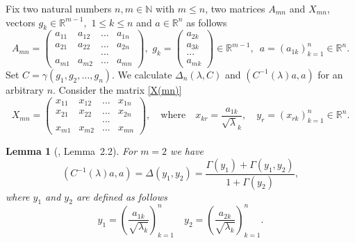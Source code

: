 \documentclass[preprint,12pt]{elsarticle}
\newcommand{\commA}[1]{\marginpar{%
\begin{color}{red}
\vskip-\baselineskip %
\raggedright\footnotesize
\itshape\hrule \smallskip A: #1\par\smallskip\hrule\end{color}}}
\newtheorem{lem}[thm]{Lemma}
\numberwithin{equation}{section}
\begin{document}
%
Fix two natural numbers $n,m\in \mathbb N$ with $m\leq n$, two matrices $A_{mn}$ and $X_{mn}$, vectors $g_k\in\mathbb R^{m-1},\,\,1\leq k\leq n$
and $a\in \mathbb R^n$ as follows
\begin{equation} 
\label{A(mn)}
A_{mn}\!=\!\left(
	\begin{array}{cccc}
	a_{11}&a_{12}          &...&a_{1n}\\
	a_{21}&a_{22}          &...&a_{2n}\\
	&&...&\\
	a_{m1}&a_{m2}          &...&a_{mn}
	\end{array}
	\right),\,\, 
g_k=\left(
	\begin{array}{c}
	a_{2k}\\
	a_{3k}\\
	... \\
	a_{mk}
	\end{array}
	\right)\in \mathbb R^{m-1},\,\,\, a=(a_{1k})_{k=1}^n\in \mathbb R^n.	
\end{equation}
Set $C=\gamma(g_1,g_2,\dots,g_n)$. We calculate $\Delta_n(\lambda, C)$ and $(C^{-1}(\lambda)a,a)$ for an arbitrary $n$. 
Consider the matrix \eqref{X(mn)}
\begin{equation}
\label{X(mn).1}
X_{mn} =\left(
\begin{array}{cccc}
x_{11}&x_{12}&...&x_{1n}\\
x_{21}&x_{22}&...&x_{2n}\\
&&...&\\
x_{m1}&x_{m2}&...&x_{mn}
\end{array}
\right),\quad \text{where}\quad x_{kr}=\frac{a_{1k}}{\sqrt \lambda_k},\quad y_r=(x_{rk})_{k=1}^n\in \mathbb R^n.
\end{equation}
%
\begin{lem}[\cite{Kos-hpl-arx20}, Lemma~2.2]
\label{l.m=2}
For $m=2$ we have
\begin{equation}
\label{m=2}
(C^{-1}(\lambda)a,a)=\Delta(y_1,y_2)=\frac{\Gamma(y_1)+\Gamma(y_1,y_2)}{1+\Gamma(y_2)},
\end{equation}
where $y_1$ and $y_2$ are defined as follows
\begin{equation}
\label{y(1),y(2)=} 
y_1=\left(\frac{a_{1k}}{\sqrt{\lambda_k}}\right)_{k=1}^n\quad y_2=\left(\frac{a_{2k}}{\sqrt{\lambda_k}}\right)_{k=1}^n.
\end{equation} 
\end{lem}
\end{document}
